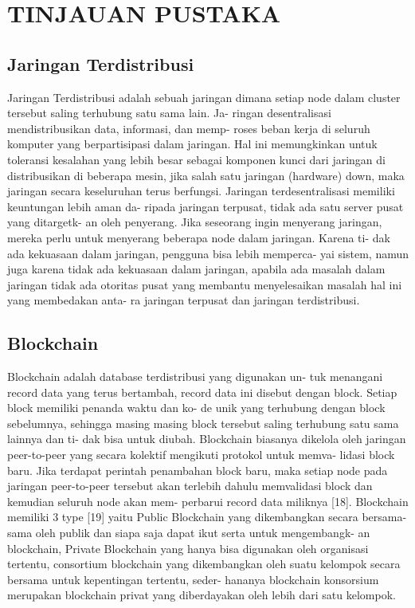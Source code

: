 \section{TINJAUAN PUSTAKA}


\subsection{Jaringan Terdistribusi}

Jaringan Terdistribusi adalah sebuah jaringan dimana setiap
node dalam cluster tersebut saling terhubung satu sama lain. Ja-
ringan desentralisasi mendistribusikan data, informasi, dan memp-
roses beban kerja di seluruh komputer yang berpartisipasi dalam
jaringan. Hal ini memungkinkan untuk toleransi kesalahan yang
lebih besar sebagai komponen kunci dari jaringan di distribusikan
di beberapa mesin, jika salah satu jaringan (hardware) down, maka
jaringan secara keseluruhan terus berfungsi.
Jaringan terdesentralisasi memiliki keuntungan lebih aman da-
ripada jaringan terpusat, tidak ada satu server pusat yang ditargetk-
an oleh penyerang. Jika seseorang ingin menyerang jaringan, mereka
perlu untuk menyerang beberapa node dalam jaringan. Karena ti-
dak ada kekuasaan dalam jaringan, pengguna bisa lebih memperca-
yai sistem, namun juga karena tidak ada kekuasaan dalam jaringan,
apabila ada masalah dalam jaringan tidak ada otoritas pusat yang
membantu menyelesaikan masalah hal ini yang membedakan anta-
ra jaringan terpusat dan jaringan terdistribusi.

\subsection{Blockchain}

Blockchain adalah database terdistribusi yang digunakan un-
tuk menangani record data yang terus bertambah, record data ini
disebut dengan block. Setiap block memiliki penanda waktu dan ko-
de unik yang terhubung dengan block sebelumnya, sehingga masing
masing block tersebut saling terhubung satu sama lainnya dan ti-
dak bisa untuk diubah. Blockchain biasanya dikelola oleh jaringan
peer-to-peer yang secara kolektif mengikuti protokol untuk memva-
lidasi block baru. Jika terdapat perintah penambahan block baru,
maka setiap node pada jaringan peer-to-peer tersebut akan terlebih
dahulu memvalidasi block dan kemudian seluruh node akan mem-
perbarui record data miliknya [18]. Blockchain memiliki 3 type [19]
yaitu Public Blockchain yang dikembangkan secara bersama-sama
oleh publik dan siapa saja dapat ikut serta untuk mengembangk-
an blockchain, Private Blockchain yang hanya bisa digunakan oleh
organisasi tertentu, consortium blockchain yang dikembangkan oleh
suatu kelompok secara bersama untuk kepentingan tertentu, seder-
hananya blockchain konsorsium merupakan blockchain privat yang
diberdayakan oleh lebih dari satu kelompok.

